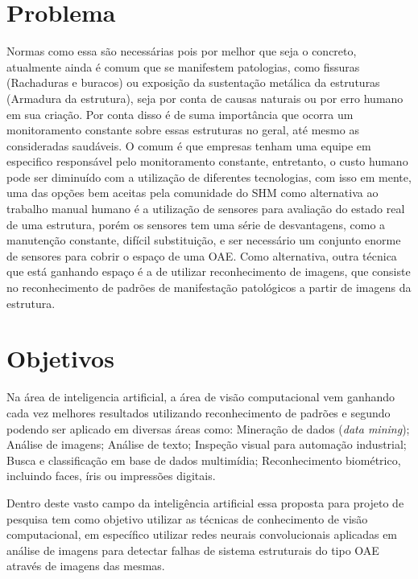 \section{Problema}

Normas como essa são necessárias pois por melhor que seja o concreto, atualmente ainda é comum que se manifestem patologias, como fissuras (Rachaduras e buracos) ou exposição da sustentação metálica da estruturas (Armadura da estrutura), seja por conta de causas naturais ou por erro humano em sua criação. Por conta disso é de suma importância que ocorra um monitoramento constante sobre essas estruturas no geral, até mesmo as consideradas saudáveis. 
O comum é que empresas tenham uma equipe em especifico responsável pelo monitoramento constante, entretanto, o custo humano pode ser diminuído com a utilização de diferentes tecnologias, com isso em mente, uma das opções bem aceitas pela comunidade do SHM como alternativa ao trabalho manual humano é a utilização de sensores para avaliação do estado real de uma estrutura, porém os sensores tem uma série de desvantagens, como a manutenção constante, difícil substituição, e ser necessário um conjunto enorme de sensores para cobrir o espaço de uma OAE. Como alternativa, outra técnica que está ganhando espaço é a de utilizar reconhecimento de imagens, que consiste no reconhecimento de padrões de manifestação patológicos a partir de imagens da estrutura.


\section{Objetivos}

Na área de inteligencia artificial, a área de visão computacional vem ganhando cada vez melhores resultados utilizando reconhecimento de padrões e segundo  podendo ser aplicado em diversas áreas como: Mineração de dados (\textit{data mining}); Análise de imagens; Análise de texto; Inspeção visual para automação industrial; Busca e classificação em base de dados multimídia; Reconhecimento biométrico, incluindo faces, íris ou impressões digitais.

Dentro deste vasto campo da inteligência artificial essa proposta para projeto de pesquisa tem como objetivo utilizar as técnicas de conhecimento de visão computacional, em específico utilizar redes neurais convolucionais aplicadas em análise de imagens para detectar falhas de sistema estruturais do tipo OAE através de imagens das mesmas.

